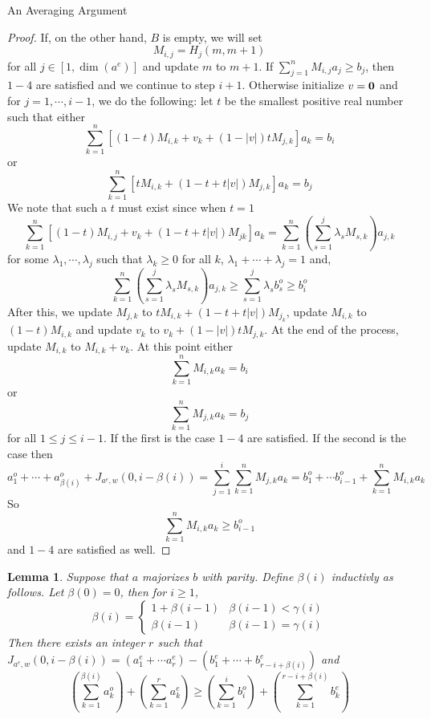 \documentclass[11pt,a4paper]{article}
\newtheorem{lemma}[subsection]{Lemma}
\begin{document}
\begin{section}{An Averaging Argument}
\begin{proof}
\medskip
If, on the other hand, $B$ is empty, we will set
\[
M_{i, j} = H_j (m, m + 1)
\]
for all $j \in [1, \dim(a^e)]$ and update $m$ to $m + 1$. If $\sum_{j = 1}^n M_{i, j} a_j \geq b_j$, then $1-4$ are satisfied and we continue to step $i + 1$. Otherwise initialize $v = \bf{0}$ and for $j = 1, \cdots, i - 1$, we do the following: let $t$ be the smallest positive real number such that either
\[
\sum_{k = 1}^n [(1 - t) M_{i, k} + v_k + (1 - |v|)t M_{j, k} ] a_k = b_i
\]
or
\[
\sum_{k = 1}^n [ t M_{i, k} + (1 - t + t|v| ) M_{j, k} ] a_k = b_j
\]
We note that such a $t$ must exist since when $t = 1$
\[
\sum_{k = 1}^n [ (1 - t) M_{i, j} + v_k + (1 - t + t|v|) M_{j k} ] a_k = \sum_{k = 1}^n \left ( \sum_{s = 1}^j \lambda_s M_{s, k} \right ) a_{j, k}
\]
for some $\lambda_1, \cdots, \lambda_j$ such that $\lambda_k \geq 0$ for all $k$, $\lambda_1 + \cdots + \lambda_j = 1$ and,
\[
\sum_{k = 1}^n \left ( \sum_{s = 1}^j \lambda_s M_{s, k} \right ) a_{j, k} \geq \sum_{s = 1}^j \lambda_s b^o_s \geq b^o_i
\]
After this, we update $M_{j, k}$ to $t M_{i, k} + (1 - t + t|v|) M_{j_k}$, update $M_{i, k}$ to $(1 - t) M_{i, k}$ and update $v_k$ to $ v_k + (1 - |v|) t M_{j, k}$.
\medskip
At the end of the process, update $M_{i, k}$ to $M_{i, k}+ v_k$. At this point either
\[
\sum_{k = 1}^n M_{i, k} a_k = b_i
\]
or
\[
\sum_{k = 1}^n M_{j, k} a_k = b_j
\]
for all $1 \leq j \leq i - 1$. If the first is the case $1-4$ are satisfied. If the second is the case then
\[
a^o_1 + \cdots + a^o_{\beta(i)} + J_{a^e, w}(0, i - \beta(i) ) = \sum_{j = 1}^i \sum_{k = 1}^n M_{j, k} a_k = b^o_1 + \cdots b^o_{i-1} + \sum_{k = 1}^n M_{i, k} a_k
\]
So
\[
\sum_{k = 1}^n M_{i, k} a_k \geq b^o_{i - 1}
\]
and $1-4$ are satisfied as well.
\end{proof}

\begin{lemma} \label{lemma_step} Suppose that $a$ majorizes $b$ with parity. Define $\beta(i)$ inductivly as follows. Let $\beta(0) = 0$, then for $i \geq 1$, 
\[
\beta(i) = \begin{cases} 1 + \beta(i - 1) & \beta(i - 1) < \gamma(i) \\  \beta(i - 1) & \beta(i - 1) = \gamma(i) \end{cases}
\]
Then there exists an integer $r$ such that $J_{a^e, w} (0, i - \beta(i) ) = (a^e_1 + \cdots a^e_r) - (b^e_1 + \cdots + b^e_{r - i + \beta(i)})$ and
\[
\left ( \sum_{k = 1}^{\beta(i)} a^o_{k} \right ) + \left ( \sum_{k = 1}^{r} a^e_k \right )  \geq  \left ( \sum_{k = 1}^i b^o_i \right ) + \left ( \sum_{k = 1}^{r - i + \beta(i) } b^e_k \right )
\]
\end{lemma}


\end{section}
\end{document}
